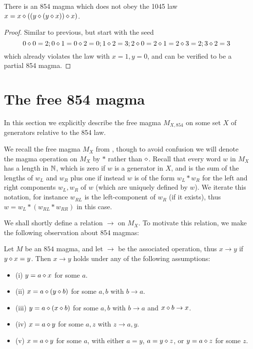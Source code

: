 \begin{corollary}\leanok{}\label{854-1045}  There is an 854 magma which does not obey the 1045 law $x = x \diamond ((y \diamond (y \diamond x)) \diamond x)$.
\end{corollary}

\begin{proof} Similar to previous, but start with the seed
$$ 0 \diamond 0 = 2; 0 \diamond 1 = 0 \diamond 2 = 0; 1 \diamond 2 = 3; 2 \diamond 0 = 2 \diamond 1 = 2 \diamond 3 = 2; 3 \diamond 2 = 3$$
which already violates the law with $x=1,y=0$, and can be verified to be a partial 854 magma.
\end{proof}

\section{The free 854 magma}

In this section we explicitly describe the free magma $M_{X, 854}$ on some set $X$ of generators relative to the 854 law.

We recall the free magma $M_X$ from , though to avoid confusion we will denote the magma operation on $M_X$ by $*$ rather than $\diamond$.  Recall that every word $w$ in $M_X$ has a length in $\mathbb{N}$, which is zero if $w$ is a generator in $X$, and is the sum of the lengths of $w_L$ and $w_R$ plus one if instead $w$ is of the form $w_L * w_R$ for the left and right components $w_L, w_R$ of $w$ (which are uniquely defined by $w$).  We iterate this notation, for instance $w_{RL}$ is the left-component of $w_R$ (if it exists), thus $w = w_L * (w_{RL} * w_{RR})$ in this case.

We shall shortly define a relation $\to$ on $M_X$.  To motivate this relation, we make the following observation about 854 magmas:

\begin{lemma}\label{854-relation}  Let $M$ be an $854$ magma, and let $\to$ be the associated operation, thus $x \to y$ if $y \diamond x = y$.  Then $x \to y$ holds under any of the following assumptions:
  \begin{itemize}
  \item (i) $y = a \diamond x$ for some $a$.
  \item (ii) $x = a \diamond (y \diamond b)$ for some $a,b$ with $b \to a$.
  \item (iii) $y = a \diamond (x \diamond b)$ for some $a,b$ with $b \to a$ and $x \diamond b \to x$.
  \item (iv) $x = a \diamond y$ for some $a,z$ with $z \to a, y$.
  \item (v) $x = a \diamond y$ for some $a$, with either $a=y$, $a = y \diamond z$, or $y = a \diamond z$ for some $z$.
  \end{itemize}
\end{lemma}

